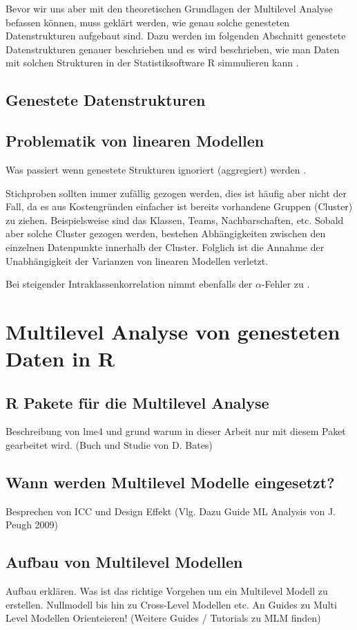 \documentclass[12pt]{article}\usepackage[]{graphicx}\usepackage[]{color}
\begin{document}

Bevor wir uns aber mit den theoretischen Grundlagen der Multilevel Analyse befassen können, muss geklärt werden, wie genau solche genesteten Datenstrukturen aufgebaut sind. Dazu werden im folgenden Abschnitt genestete Datenstrukturen genauer beschrieben und es wird beschrieben, wie man Daten mit solchen Strukturen in der Statistiksoftware R simmulieren kann \cite{R}.

\subsection{Genestete Datenstrukturen}
\subsection{Problematik von linearen Modellen}
Was passiert wenn genestete Strukturen ignoriert (aggregiert) werden \cite{SnijdersTomA.B2012Ma:a}.

Stichproben sollten immer zufällig gezogen werden, dies ist häufig aber nicht der Fall, da es aus Kostengründen einfacher ist bereits vorhandene Gruppen (Cluster) zu ziehen. Beispielsweise sind das Klassen, Teams, Nachbarschaften, etc. Sobald aber solche Cluster gezogen werden, bestehen Abhängigkeiten zwischen den einzelnen Datenpunkte innerhalb der Cluster. Folglich ist die Annahme der Unabhängigkeit der Varianzen von linearen Modellen verletzt.

Bei steigender Intraklassenkorrelation nimmt ebenfalls der $\alpha$-Fehler zu \cite{dorman2008effect}.

\section{Multilevel Analyse von genesteten Daten in R}
\subsection{R Pakete für die Multilevel Analyse}
Beschreibung von lme4 und grund warum in dieser Arbeit nur mit diesem Paket gearbeitet wird. (Buch und Studie von D. Bates)

\subsection{Wann werden Multilevel Modelle eingesetzt?}
Besprechen von ICC und Design Effekt (Vlg. Dazu Guide ML Analysis von J. Peugh 2009)

\subsection{Aufbau von Multilevel Modellen}
Aufbau erklären. Was ist das richtige Vorgehen um ein Multilevel Modell zu erstellen. Nullmodell bis hin zu Cross-Level Modellen etc. An Guides zu Multi Level Modellen Orienteieren! \cite{SnijdersTomA.B2012Ma:a} (Weitere Guides / Tutorials zu MLM finden)
\end{document}
